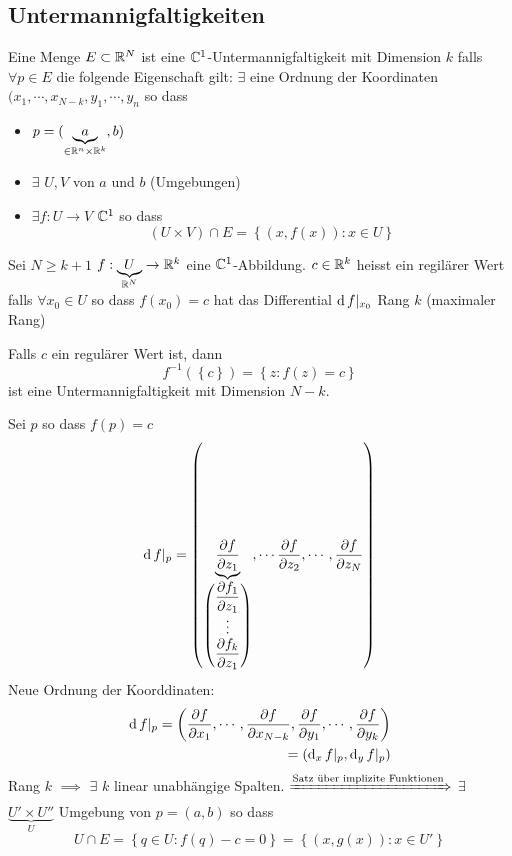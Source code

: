 \subsection{Untermannigfaltigkeiten}
\begin{Def}
  Eine Menge $E\subset\mathbb{R}^N$ ist eine $\mathbb{C}^1$-Untermannigfaltigkeit mit Dimension $k$ falls $\forall p\in E$ die folgende Eigenschaft gilt: $\exists$ eine Ordnung der Koordinaten $(x_1,\cdots,x_{N-k}, y_1,\cdots,y_n$ so dass
  \begin{itemize}
    \item $p=(\underbrace{a}_{\in\mathbb{R}^n\times \mathbb{R}^k},b)$
    \item $\exists$ $U,V$ von $a$ und $b$ (Umgebungen)
    \item $\exists f:U\to V$ $\mathbb{C}^1$ so dass
      \[(U\times V)\cap E= \left\{ (x,f(x)):x\in U \right\}\]
  \end{itemize}
\end{Def}
\begin{Def}
  Sei $N\geq k+1$ $f:\underbrace{U}_{\mathbb{R}^N}\rightarrow\mathbb{R}^k$ eine $\mathbb{C}^1$-Abbildung. $c\in\mathbb{R}^k$ heisst ein regilärer Wert falls $\forall x_0\in U$ so dass $f(x_0)=c$ hat das Differential $\operatorname{d} f|_{x_0}$ Rang $k$ (maximaler Rang)
\end{Def}
\begin{Sat}
  Falls $c$ ein regulärer Wert ist, dann 
  \[f^{-1}(\left\{ c \right\})=\left\{ z:f(z)=c \right\}\]
  ist eine Untermannigfaltigkeit mit Dimension $N-k$.
\end{Sat}
\begin{Bew}
  Sei $p$ so dass $f(p)=c$
  \[\operatorname{d} f|_p= \left( \underbrace{\dfrac{\partial f}{\partial z_1}}_{\begin{pmatrix} \dfrac{\partial f_1}{\partial z_1}\\ \vdots \\ \dfrac{\partial f_k}{\partial z_1}\end{pmatrix}},\cdots\dfrac{\partial f}{\partial z_2},\cdots,\dfrac{\partial f}{\partial z_N} \right)\]
  Neue Ordnung der Koorddinaten:
  \begin{eqnarray*}
    \operatorname{d} f|_p=\left( \dfrac{\partial f}{\partial x_1},\cdots,\dfrac{\partial f}{\partial x_{N-k}},\dfrac{\partial f}{\partial y_1},\cdots,\dfrac{\partial f}{\partial y_k} \right)\\
    = (\operatorname{d}_x f|_p, \operatorname{d}_y f|_p)
  \end{eqnarray*}
  Rang $k$ $\implies$ $\exists$ $k$ linear unabhängige Spalten. $\xRightarrow{\text{Satz über implizite Funktionen}}$ $\exists$ $\underbrace{U'\times U''}_U$ Umgebung von $p=(a,b)$ so dass
  \[U\cap E=\left\{ q\in U:f(q)-c=0 \right\}=\left\{ (x,g(x)):x\in U' \right\}\]
\end{Bew}

